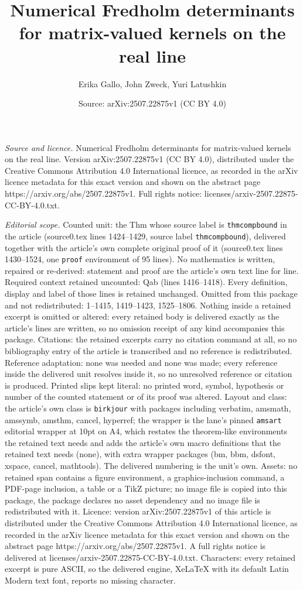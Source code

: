 \documentclass[10pt,a4paper]{amsart}
\title[Numerical Fredholm determinants for matrix-valued kernels on]{Numerical Fredholm determinants for matrix-valued kernels on the real line}
\author{Erika Gallo, John Zweck, Yuri Latushkin}
\date{Source: arXiv:2507.22875v1 (CC BY 4.0)}
\begin{document}
\maketitle

\noindent\emph{Source and licence.} Numerical Fredholm determinants for matrix-valued kernels on the real line. Version arXiv:2507.22875v1 (CC BY 4.0), distributed under the Creative Commons Attribution 4.0 International licence, as recorded in the arXiv licence metadata for this exact version and shown on the abstract page https://arxiv.org/abs/2507.22875v1. Full rights notice: licenses/arxiv-2507.22875-CC-BY-4.0.txt.\par\smallskip

\noindent\textit{Editorial scope.} Counted unit: the Thm whose source label is \texttt{thmcompbound} in the article (source0.tex lines 1424--1429, source label \texttt{thmcompbound}), delivered together with the article's own complete original proof of it (source0.tex lines 1430--1524, one \texttt{proof} environment of 95 lines). No mathematics is written, repaired or re-derived: statement and proof are the article's own text line for line. Required context retained uncounted: Qab (lines 1416--1418). Every definition, display and label of those lines is retained unchanged. Omitted from this package and not redistributed: 1--1415, 1419--1423, 1525--1806. Nothing inside a retained excerpt is omitted or altered: every retained body is delivered exactly as the article's lines are written, so no omission receipt of any kind accompanies this package. Citations: the retained excerpts carry no citation command at all, so no bibliography entry of the article is transcribed and no reference is redistributed. Reference adaptation: none was needed and none was made; every reference inside the delivered unit resolves inside it, so no unresolved reference or citation is produced. Printed slips kept literal: no printed word, symbol, hypothesis or number of the counted statement or of its proof was altered. Layout and class: the article's own class is \texttt{birkjour} with packages including verbatim, amsmath, amssymb, amsthm, cancel, hyperref; the wrapper is the lane's pinned \texttt{amsart} editorial wrapper at 10pt on A4, which restates the theorem-like environments the retained text needs and adds the article's own macro definitions that the retained text needs (none), with extra wrapper packages (bm, bbm, dsfont, xspace, cancel, mathtools). The delivered numbering is the unit's own. Assets: no retained span contains a figure environment, a graphics-inclusion command, a PDF-page inclusion, a table or a TikZ picture; no image file is copied into this package, the package declares no asset dependency and no image file is redistributed with it. Licence: version arXiv:2507.22875v1 of this article is distributed under the Creative Commons Attribution 4.0 International licence, as recorded in the arXiv licence metadata for this exact version and shown on the abstract page https://arxiv.org/abs/2507.22875v1. A full rights notice is delivered at licenses/arxiv-2507.22875-CC-BY-4.0.txt. Characters: every retained excerpt is pure ASCII, so the delivered engine, XeLaTeX with its default Latin Modern text font, reports no missing character.
\end{document}
